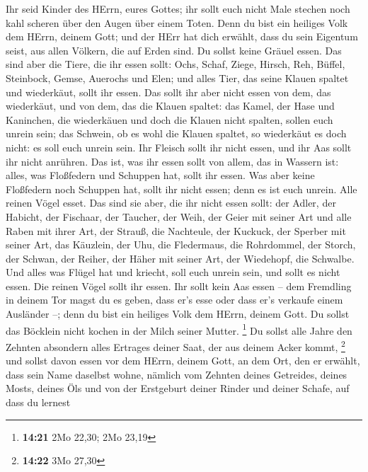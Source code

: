  Ihr seid Kinder des HErrn, eures Gottes; ihr sollt euch
nicht Male stechen noch kahl scheren über den Augen über einem Toten.
 Denn du bist ein heiliges Volk dem HErrn, deinem Gott;
und der HErr hat dich erwählt, dass du sein Eigentum seist, aus allen
Völkern, die auf Erden sind.  Du sollst keine Gräuel
essen.  Das sind aber die Tiere, die ihr essen sollt:
Ochs, Schaf, Ziege,  Hirsch, Reh, Büffel, Steinbock,
Gemse, Auerochs und Elen;  und alles Tier, das seine
Klauen spaltet und wiederkäut, sollt ihr essen.  Das sollt
ihr aber nicht essen von dem, das wiederkäut, und von dem, das die
Klauen spaltet: das Kamel, der Hase und Kaninchen, die wiederkäuen und
doch die Klauen nicht spalten, sollen euch unrein sein; 
das Schwein, ob es wohl die Klauen spaltet, so wiederkäut es doch nicht:
es soll euch unrein sein. Ihr Fleisch sollt ihr nicht essen, und ihr Aas
sollt ihr nicht anrühren.  Das ist, was ihr essen sollt
von allem, das in Wassern ist: alles, was Floßfedern und Schuppen hat,
sollt ihr essen.  Was aber keine Floßfedern noch Schuppen
hat, sollt ihr nicht essen; denn es ist euch unrein. 
Alle reinen Vögel esset.  Das sind sie aber, die ihr
nicht essen sollt: der Adler, der Habicht, der Fischaar, 
der Taucher, der Weih, der Geier mit seiner Art  und alle
Raben mit ihrer Art,  der Strauß, die Nachteule, der
Kuckuck, der Sperber mit seiner Art,  das Käuzlein, der
Uhu, die Fledermaus,  die Rohrdommel, der Storch, der
Schwan,  der Reiher, der Häher mit seiner Art, der
Wiedehopf, die Schwalbe.  Und alles was Flügel hat und
kriecht, soll euch unrein sein, und sollt es nicht essen.
 Die reinen Vögel sollt ihr essen.  Ihr
sollt kein Aas essen -- dem Fremdling in deinem Tor magst du es geben,
dass er's esse oder dass er's verkaufe einem Ausländer --; denn du bist
ein heiliges Volk dem HErrn, deinem Gott. Du sollst das Böcklein nicht
kochen in der Milch seiner Mutter. \footnote{\textbf{14:21} 2Mo 22,30;
  2Mo 23,19}  Du sollst alle Jahre den Zehnten absondern
alles Ertrages deiner Saat, der aus deinem Acker kommt, \footnote{\textbf{14:22}
  3Mo 27,30}  und sollst davon essen vor dem HErrn,
deinem Gott, an dem Ort, den er erwählt, dass sein Name daselbst wohne,
nämlich vom Zehnten deines Getreides, deines Mosts, deines Öls und von
der Erstgeburt deiner Rinder und deiner Schafe, auf dass du lernest
